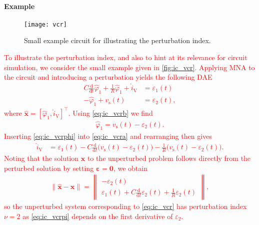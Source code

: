 \documentclass[AMA,STIX1COL]{WileyNJD-v2}
\newcommand{\mb}[1]{\mathbf{#1}}
\newcommand{\mbh}[1]{\hat{\mathbf{#1}}}
\newcommand{\mr}[1]{\mathrm{#1}}
\newcommand{\T}{{\!\top}}
\newcommand{\ddt}{\frac{\mathrm{d}}{\mathrm{d}t}}
\begin{document}
\paragraph{Example}
\begin{figure}[b]
    \begin{center}
        \texttt{[image: vcr]}
    \end{center}
    \caption{Small example circuit for illustrating the perturbation index.}
    \label{fig:ic_vcr}
\end{figure}
\textcolor{red}{To illustrate the perturbation index, and also to hint at its relevance for circuit simulation, we consider the small example given in \autoref{fig:ic_vcr}. Applying MNA to the circuit and introducing a perturbation yields the following DAE
\begin{subequations}
    \label{eq:ic_vcr}
    \begin{align}
        C \ddt \hat{\varphi}_1 + \frac{1}{R} \hat{\varphi}_1 + \hat{i}_\mr{V} &= \varepsilon_1(t) \label{eq:ic_vcra}\\
        -\hat{\varphi}_1 + v_\mr{s}(t) &= \varepsilon_2(t), \label{eq:ic_vcrb}
    \end{align}
\end{subequations}
where $\mbh{x} = [\hat{\varphi}_1, \hat{i}_\mr{V}]^\T$. Using \eqref{eq:ic_vcrb} we find
\begin{align}
    \hat{\varphi}_1 = v_\mr{s}(t) - \varepsilon_2(t). \label{eq:ic_vcrphi}
\end{align}
Inserting \eqref{eq:ic_vcrphi} into \eqref{eq:ic_vcra} and rearranging then gives
\begin{align*}
    \hat{i}_\mr{V} &= \varepsilon_1(t) - C \ddt \big( v_\mr{s}(t) - \varepsilon_2(t) \big) - \frac{1}{R} \big( v_\mr{s}(t) - \varepsilon_2(t) \big).
\end{align*}
Noting that the solution $\mb{x}$ to the unperturbed problem follows directly from the perturbed solution by setting $\boldsymbol{\varepsilon} = \mb{0}$, we obtain
\begin{align}
    \| \mbh{x} - \mb{x} \| = \begin{Vmatrix}
        -\varepsilon_2(t)\\
        \varepsilon_1(t) + C \ddt \varepsilon_2(t) + \frac{1}{R} \varepsilon_2(t)
    \end{Vmatrix}, \label{eq:ic_vcrpi}
\end{align}
so the unperturbed system corresponding to \eqref{eq:ic_vcr} has perturbation index $\nu = 2$ as \eqref{eq:ic_vcrpi} depends on the first derivative of $\varepsilon_2$.}
\end{document}
